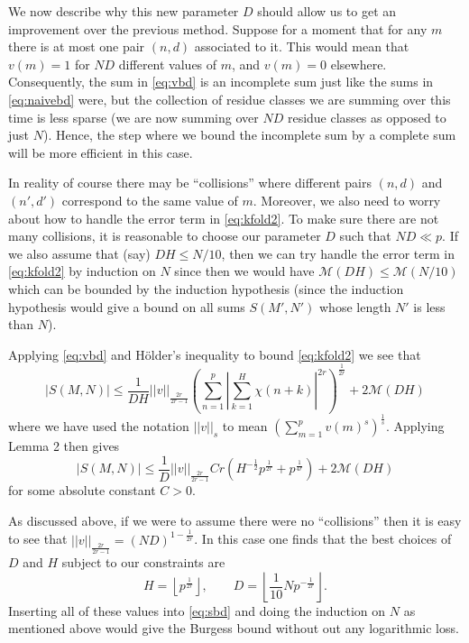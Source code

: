 \documentclass[a4paper,11pt,twoside]{amsart}
\begin{document}
We now describe why this new parameter $D$ should allow us to get an improvement over the previous method. Suppose for a moment that for any $m$ there is at most one pair $(n, d)$ associated to it. This would mean that $v(m)=1$ for $ND$ different values of $m$, and $v(m)=0$ elsewhere. Consequently, the sum in \eqref{eq:vbd} is an incomplete sum just like the sums in \eqref{eq:naivebd} were, but the collection of residue classes we are summing over this time is less sparse (we are now summing over $ND$ residue classes as opposed to just $N$). Hence, the step where we bound the incomplete sum by a complete sum will be more efficient in this case.

In reality of course there may be ``collisions'' where different pairs $(n, d)$ and $(n', d')$ correspond to the same value of $m$. Moreover, we also need to worry about how to handle the error term in \eqref{eq:kfold2}. To make sure there are not many collisions, it is reasonable to choose our parameter $D$ such that $ND \ll p$. If we also assume that (say) $DH \leq N/10$, then we can try handle the error term in \eqref{eq:kfold2} by induction on $N$ since then we would have $\mathcal{M}(DH) \leq \mathcal{M}(N/10)$ which can be bounded by the induction hypothesis (since the induction hypothesis would give a bound on all sums $S(M',N')$ whose length $N'$ is less than $N$).

Applying \eqref{eq:vbd} and H\"{o}lder's inequality to bound \eqref{eq:kfold2} we see that
\[
|S(M,N)| \leq \frac{1}{DH} ||v||_{\frac{2r}{2r-1}} \left( \sum_{n=1}^{p} \left| \sum_{k = 1}^H \chi(n + k) \right|^{2r}\right)^\frac{1}{2r} + 2 \mathcal{M}(DH)
\]
where we have used the notation $||v||_s$ to mean $\left(\sum_{m=1}^p v(m)^s \right)^{\frac{1}{s}}$. Applying Lemma 2 then gives
\begin{equation} \label{eq:sbd}
|S(M,N)| \leq \frac{1}{D} ||v||_{\frac{2r}{2r-1}} C r \left(H^{-\frac{1}{2}} p^{\frac{1}{2r}} + p^\frac{1}{4r}\right) + 2 \mathcal{M}(DH)
\end{equation}
for some absolute constant $C > 0$.

As discussed above, if we were to assume there were no ``collisions'' then it is easy to see that $||v||_{\frac{2r}{2r-1}} = (ND)^{1-\frac{1}{2r}}$. In this case one finds that the best choices of $D$ and $H$ subject to our constraints are
\begin{equation} \label{eq:params}
H = \left\lfloor p^{\frac{1}{2r}}\right\rfloor, \quad\quad D = \left\lfloor \frac{1}{10} N p^{-\frac{1}{2r}}\right\rfloor.
\end{equation}
Inserting all of these values into \eqref{eq:sbd} and doing the induction on $N$ as mentioned above would give the Burgess bound without out any logarithmic loss.
\end{document}
